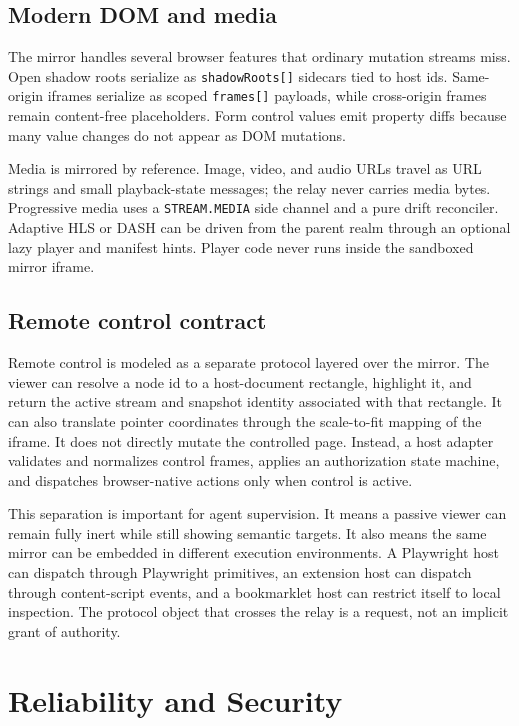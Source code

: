 \documentclass[conference]{IEEEtran}
\newcommand{\code}[1]{\texttt{\small #1}}
\begin{document}
\subsection{Modern DOM and media}

The mirror handles several browser features that ordinary mutation streams miss.
Open shadow roots serialize as \code{shadowRoots[]} sidecars tied to host ids.
Same-origin iframes serialize as scoped \code{frames[]} payloads, while
cross-origin frames remain content-free placeholders. Form control values emit
property diffs because many value changes do not appear as DOM mutations.

Media is mirrored by reference. Image, video, and audio URLs travel as URL
strings and small playback-state messages; the relay never carries media bytes.
Progressive media uses a \code{STREAM.MEDIA} side channel and a pure drift
reconciler. Adaptive HLS or DASH can be driven from the parent realm through an
optional lazy player and manifest hints. Player code never runs inside the
sandboxed mirror iframe.

\subsection{Remote control contract}

Remote control is modeled as a separate protocol layered over the mirror. The
viewer can resolve a node id to a host-document rectangle, highlight it, and
return the active stream and snapshot identity associated with that rectangle.
It can also translate pointer coordinates through the scale-to-fit mapping of
the iframe. It does not directly mutate the controlled page. Instead, a host
adapter validates and normalizes control frames, applies an authorization state
machine, and dispatches browser-native actions only when control is active.

This separation is important for agent supervision. It means a passive viewer
can remain fully inert while still showing semantic targets. It also means the
same mirror can be embedded in different execution environments. A Playwright
host can dispatch through Playwright primitives, an extension host can dispatch
through content-script events, and a bookmarklet host can restrict itself to
local inspection. The protocol object that crosses the relay is a request, not
an implicit grant of authority.

\section{Reliability and Security}
\end{document}
